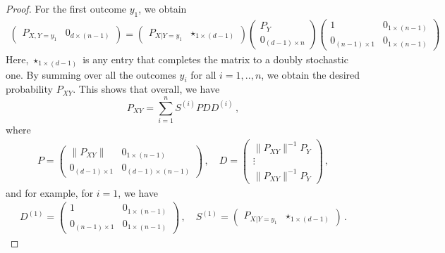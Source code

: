\documentclass[10pt,a4paper]{amsart}
\begin{document}
\begin{proof}
For the first outcome $y_1$, we obtain
\begin{align}
\begin{pmatrix}
     P_{X,Y=y_1} & 0_{d \times (n-1)}  
\end{pmatrix}=
\begin{pmatrix}
    P_{X|Y=y_1} & \star_{1\times (d-1)} 
\end{pmatrix} 
\begin{pmatrix}
     P_{Y} \\
    0_{(d-1) \times n}   
\end{pmatrix}
\begin{pmatrix}
    1 & 0_{1\times (n-1)}\\
    0_{(n-1) \times 1} & 0_{1\times (n-1)} 
\end{pmatrix}
\end{align}
Here, $\star_{1\times (d-1)}$ is any entry that completes the matrix to a doubly stochastic one. By summing over all the outcomes $y_i$ for all $i=1,..,n$, we obtain the desired probability $P_{XY}$. This shows that overall, we have
\begin{equation}
    P_{XY} = \sum_{i=1}^n S^{(i)} P DD^{(i)} \,, 
\end{equation}
where 
\begin{align}
P=\begin{pmatrix}
    \|P_{XY}\| & 0_{1\times (n-1)} \\
    0_{(d-1)\times 1} & 0_{(d-1)\times (n-1)}
\end{pmatrix} \,, \quad 
    D=\begin{pmatrix}
    \|P_{XY}\|^{-1} P_{Y} \\
    \vdots \\
    \|P_{XY}\|^{-1} P_{Y}    
\end{pmatrix} \,,
\end{align}
and for example, for $i=1$, we have
\begin{align}
D^{(1)}=\begin{pmatrix}
    1 & 0_{1\times (n-1)}\\
    0_{(n-1) \times 1} & 0_{1\times (n-1)} 
\end{pmatrix} \,,\quad 
S^{(1)} = \begin{pmatrix}
    P_{X|Y=y_1} & \star_{1\times (d-1)} 
\end{pmatrix}  \,.
\end{align}

\end{proof}
\end{document}
